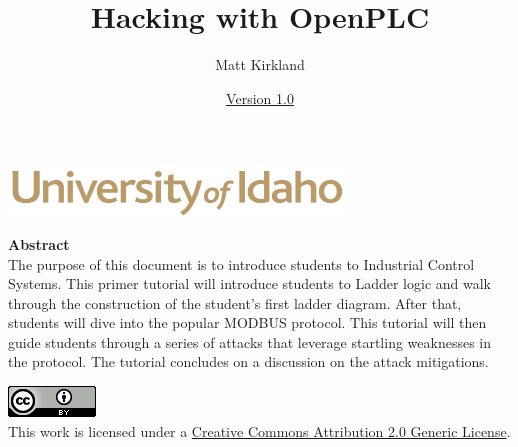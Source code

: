\documentclass[12pt]{extarticle}
\begin{document}
\title{Hacking with OpenPLC}
\author{Matt Kirkland}
\date{\hyperref[changelog]{Version 1.0}} %
\renewcommand{\abstractname}{Summary}
\begin{titlepage}
\maketitle
{}
\begin{center}
\includegraphics[scale=.5]{figures/UofI}


\vskip 40pt

\textbf{Abstract}\\
The purpose of this document is to introduce students to Industrial Control Systems. This primer tutorial will introduce students to Ladder logic and walk through the construction of the student's first ladder diagram. After that, students will dive into the popular MODBUS protocol. This tutorial will then guide students through a series of attacks that leverage startling weaknesses in the protocol. The tutorial concludes on a discussion on the attack mitigations.

\end{center}


\vfill
\begin{center}
\includegraphics[scale=.5]{figures/cc}\\
This work is licensed under a \href{https://creativecommons.org/licenses/by/2.0/}{Creative Commons Attribution 2.0 Generic License}.
\vskip 10pt
\end{center}

\end{titlepage}


\pagebreak
\tableofcontents


\pagebreak
{}
\setcounter{section}{1}
\end{document}
